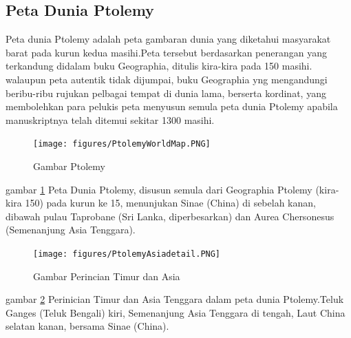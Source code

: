 \subsection{Peta Dunia Ptolemy}
		Peta dunia Ptolemy adalah peta gambaran dunia yang diketahui masyarakat barat pada kurun kedua masihi.Peta tersebut berdasarkan penerangan yang terkandung didalam buku Geographia, ditulis kira-kira pada 150 masihi. walaupun peta autentik tidak dijumpai, buku Geographia yng mengandungi beribu-ribu rujukan pelbagai tempat di dunia lama, berserta kordinat, yang membolehkan para pelukis peta menyusun semula peta dunia Ptolemy apabila manuskriptnya telah ditemui sekitar 1300 masihi.
	\begin{figure} [ht]
	\centerline{\texttt{[image: figures/PtolemyWorldMap.PNG]}}
	\caption{Gambar Ptolemy}	
	\label{PtolemyWorldMap}
	\end{figure}
	gambar \ref {PtolemyWorldMap} Peta Dunia Ptolemy, disusun semula dari Geographia Ptolemy (kira-kira 150) pada kurun ke 15, menunjukan Sinae (China) di sebelah kanan, dibawah pulau Taprobane (Sri Lanka, diperbesarkan) dan Aurea Chersonesus (Semenanjung Asia Tenggara).

	\begin{figure} [ht]
	\centerline{\texttt{[image: figures/PtolemyAsiadetail.PNG]}}	
	\caption{Gambar Perincian Timur dan Asia}
	\label{PtolemyAsiadetail}		
	\end{figure}
	gambar \ref{PtolemyAsiadetail} Perinician Timur dan Asia Tenggara dalam peta dunia Ptolemy.Teluk Ganges (Teluk Bengali) kiri, Semenanjung Asia Tenggara di tengah, Laut China selatan kanan, bersama Sinae (China).
	
